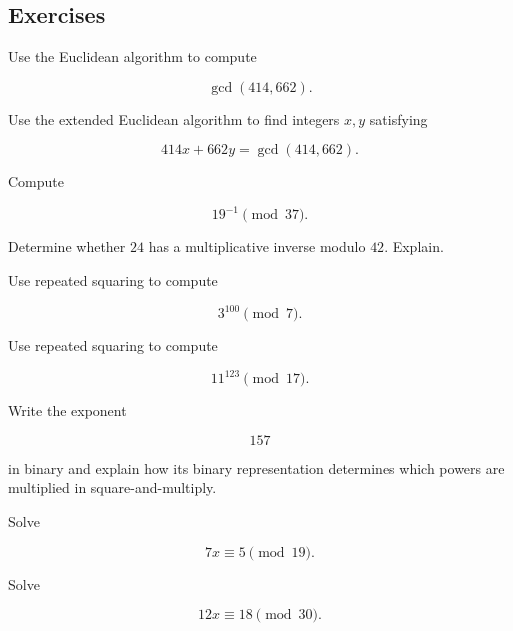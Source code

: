 \subsection{Exercises}
\label{subsec:computational-number-theory-exercises}

\begin{exercise}[1]
Use the Euclidean algorithm to compute

\[ \gcd(414,662). \]
\end{exercise}

\begin{exercise}[2]
Use the extended Euclidean algorithm to find integers \(x,y\) satisfying

\[ 414x+662y=\gcd(414,662). \]
\end{exercise}

\begin{exercise}[1]
Compute

\[ 19^{-1}\pmod{37}. \]
\end{exercise}

\begin{exercise}[2]
Determine whether \(24\) has a multiplicative inverse modulo \(42\).
Explain.
\end{exercise}

\begin{exercise}[1]
Use repeated squaring to compute

\[ 3^{100}\pmod7. \]
\end{exercise}

\begin{exercise}[2]
Use repeated squaring to compute

\[ 11^{123}\pmod{17}. \]
\end{exercise}

\begin{exercise}[2]
Write the exponent

\[ 157 \]

in binary and explain how its binary representation determines which powers
are multiplied in square-and-multiply.
\end{exercise}

\begin{exercise}[2]
Solve

\[ 7x\equiv5\pmod{19}. \]
\end{exercise}

\begin{exercise}[2]
Solve

\[ 12x\equiv18\pmod{30}. \]
\end{exercise}

